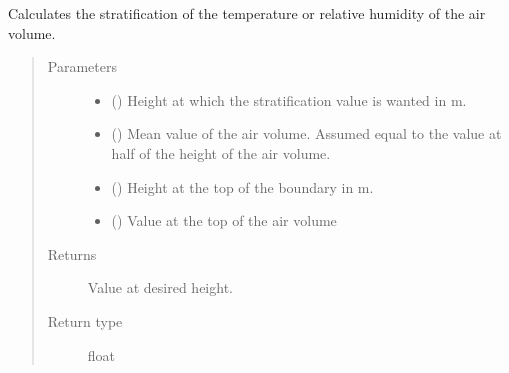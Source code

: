 \documentclass[letterpaper,10pt,english]{sphinxmanual}
\begin{document}

\begin{fulllineitems}
\label{\detokenize{air:livestock.air.stratification}}
Calculates the stratification of the temperature or relative humidity of the air volume.
\begin{quote}\begin{description}
\item[{Parameters}] \leavevmode\begin{itemize}
\item {} 
 () \textendash{} Height at which the stratification value is wanted in m.

\item {} 
 () \textendash{} Mean value of the air volume. Assumed equal to the value at half of the height of the air volume.

\item {} 
 () \textendash{} Height at the top of the boundary in m.

\item {} 
 () \textendash{} Value at the top of the air volume

\end{itemize}

\item[{Returns}] \leavevmode
Value at desired height.

\item[{Return type}] \leavevmode
float

\end{description}\end{quote}

\end{fulllineitems}

\end{document}
